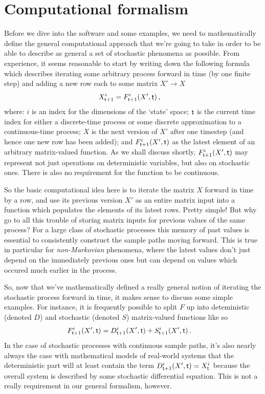 \documentclass{book}
\begin{document}
\section{\sffamily Computational formalism}

Before we dive into the software and some examples, we need to mathematically define the general computational approach that we're going to take in order to be able to describe as general a set of stochastic phenomena as possible. From experience, it seems reasonable to start by writing down the following formula which describes iterating some arbitrary process forward in time (by one finite step) and adding a new row each to some matrix $X' \rightarrow X$
\begin{align}
X^{i}_{{\sf t}+1} &= F^{i}_{{\sf t}+1}(X',{\sf t}) \,, \label{eq:x-step-def}
\end{align}
where: $i$ is an index for the dimensions of the `state' space; ${\sf t}$ is the current time index for either a discrete-time process or some discrete approximation to a continuous-time process; $X$ is the next version of $X'$ after one timestep (and hence one new row has been added); and $F^i_{{\sf t}+1}(X',{\sf t})$ as the latest element of an arbitrary matrix-valued function. As we shall discuss shortly, $F^i_{{\sf t}+1}(X',{\sf t})$ may represent not just operations on deterministic variables, but also on stochastic ones. There is also no requirement for the function to be continuous.

So the basic computational idea here is to iterate the matrix $X$ forward in time by a row, and use its previous version $X'$ as an entire matrix input into a function which populates the elements of its latest rows. Pretty simple! But why go to all this trouble of storing matrix inputs for previous values of the same process? For a large class of stochastic processes this memory of past values is essential to consistently construct the sample paths moving forward. This is true in particular for \emph{non-Markovian} phenomena, where the latest values don't just depend on the immediately previous ones but can depend on values which occured much earlier in the process.

So, now that we've mathematically defined a really general notion of iterating the stochastic process forward in time, it makes sense to discuss some simple examples. For instance, it is frequently possible to split $F$ up into deteministic (denoted $D$) and stochastic (denoted $S$) matrix-valued functions like so
\begin{align}
& F^{i}_{{\sf t}+1}(X',{\sf t}) = D^{i}_{{\sf t}+1}(X',{\sf t}) + S^{i}_{{\sf t}+1}(X',{\sf t}) \,.
\end{align}
In the case of stochastic processes with continuous sample paths, it's also nearly always the case with mathematical models of real-world systems that the deterministic part will at least contain the term $D^{i}_{{\sf t}+1}(X',{\sf t}) = X^i_{\sf t}$ because the overall system is described by some stochastic differential equation. This is not a really requirement in our general formalism, however.
\end{document}
